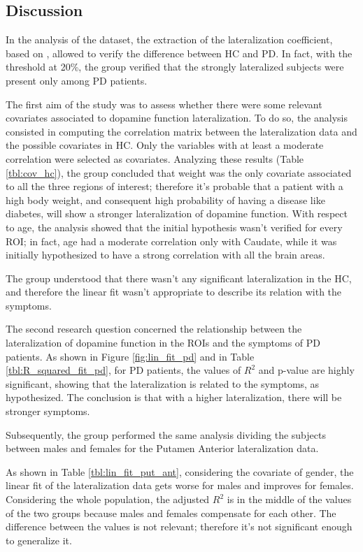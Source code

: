 \documentclass[]{article}
\begin{document}
\begin{multicols}{2}

\section{Discussion}

In the analysis of the dataset, the extraction of the lateralization coefficient, based on \cite{kaasinen_ipsilateral_2016}, allowed to verify the difference between HC and PD. In fact, with the threshold at 20\%, the group verified that the strongly lateralized subjects were present only among PD patients. 

The first aim of the study was to assess whether there were some relevant covariates associated to dopamine function lateralization. To do so, the analysis consisted in computing the correlation matrix between the lateralization data and the possible covariates in HC. Only the variables with at least a moderate correlation were selected as covariates. Analyzing these results (Table \ref{tbl:cov_hc}), the group concluded that weight was the only covariate associated to all the three regions of interest; therefore it's probable that a patient with a high body weight, and consequent high probability of having a disease like diabetes, will show a stronger lateralization of dopamine function. With respect to age, the analysis showed that the initial hypothesis wasn't verified for every ROI; in fact, age had a moderate correlation only with Caudate, while it was initially hypothesized to have a strong correlation with all the brain areas.

The group understood that there wasn't any significant lateralization in the HC, and therefore the linear fit wasn't appropriate to describe its relation with the symptoms.

The second research question concerned the relationship between the lateralization of dopamine function in the ROIs and the symptoms of PD patients.
As shown in Figure \ref{fig:lin_fit_pd} and in Table \ref{tbl:R_squared_fit_pd}, for PD patients, the values of $R^2$ and p-value are highly significant, showing that the lateralization is related to the symptoms, as hypothesized. The conclusion is that with a higher lateralization, there will be stronger symptoms.

Subsequently, the group performed the same analysis dividing the subjects between males and females for the Putamen Anterior lateralization data.

As shown in Table \ref{tbl:lin_fit_put_ant}, considering the covariate of gender, the linear fit of the lateralization data gets worse for males and improves for females.
Considering the whole population, the adjusted $R^2$ is in the middle of the values of the two groups because males and females compensate for each other. The difference between the values is not relevant; therefore it's not significant enough to generalize it.


\end{multicols}
\end{document}
